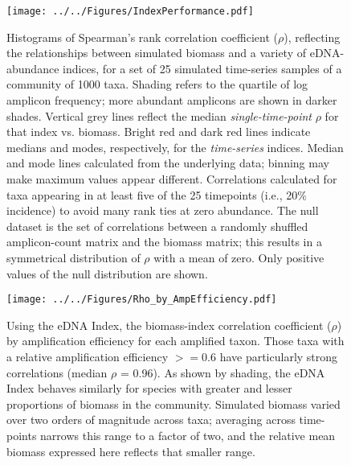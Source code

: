 \documentclass[fleqn,11pt,lineno]{wlscirep}
\begin{document}
\begin{figure}[!ht]
\begin{center}
  \texttt{[image: ../../Figures/IndexPerformance.pdf]}
  \begin{singlespace*}
  \caption{Histograms of Spearman's rank correlation coefficient ($\rho$), reflecting the relationships between simulated biomass and a variety of eDNA-abundance indices, for a set of 25 simulated time-series samples of a community of 1000 taxa. Shading refers to the quartile of log amplicon frequency; more abundant amplicons are shown in darker shades. Vertical grey lines reflect the median \textit{single-time-point} $\rho$ for that index vs. biomass. Bright red and dark red lines indicate medians and modes, respectively, for the \textit{time-series} indices. Median and mode lines calculated from the underlying data; binning may make maximum values appear different. Correlations calculated for taxa appearing in at least five of the 25 timepoints (i.e., 20\% incidence) to avoid many rank ties at zero abundance. The null dataset is the set of correlations between a randomly shuffled amplicon-count matrix and the biomass matrix; this results in a symmetrical distribution of $\rho$ with a mean of zero. Only positive values of the null distribution are shown.}
    \end{singlespace*}
\end{center}
\end{figure}


\begin{figure}[!ht]
\begin{center}
  \texttt{[image: ../../Figures/Rho\_by\_AmpEfficiency.pdf]}
  \caption{Using the eDNA Index, the biomass-index correlation coefficient ($\rho$) by amplification efficiency for each amplified taxon. Those taxa with a relative amplification efficiency $>= 0.6$ have particularly strong correlations (median $\rho$ = 0.96). As shown by shading, the eDNA Index behaves similarly for species with greater and lesser proportions of biomass in the community. Simulated biomass varied over two orders of magnitude across taxa; averaging across time-points narrows this range to a factor of two, and the relative mean biomass expressed here reflects that smaller range.}
\end{center}
\end{figure}
\end{document}
